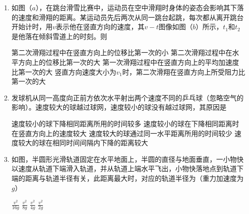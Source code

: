 
\begin{enumerate}[leftmargin=0em]
\renewcommand{\labelenumi}{\arabic{enumi}.}
\item
{}
如图（$ a $），在跳台滑雪比赛中，运动员在空中滑翔时身体的姿态会影响其下落的速度和滑翔的距离。某运动员先后两次从同一跳台起跳，每次都从离开跳台开始计时，用$ v $表示他在竖直方向的速度，其$ v-t $图像如图（$ b $）所示，$ t_{1} $和$ t_{2} $是他落在倾斜雪道上的时刻。则  
\begin{figure}[h!]
\centering

\end{figure}


\fourchoices
{第二次滑翔过程中在竖直方向上的位移比第一次的小}
{第二次滑翔过程中在水平方向上的位移比第一次的大}
{第一次滑翔过程中在竖直方向上的平均加速度比第一次的大}
{竖直方向速度大小为$ v_{1} $时，第二次滑翔在竖直方向上所受阻力比第一次的大}





\item 
{}
发球机从同一高度向正前方依次水平射出两个速度不同的乒乓球（忽略空气的影响）。速度较大的球越过球网，速度较小的球没有越过球网，其原因是  

\fourchoices
{速度较小的球下降相同距离所用的时间较多}
{速度较小的球在下降相同距离时在竖直方向上的速度较大}
{速度较大的球通过同一水平距离所用的时间较少}
{速度较大的球在相同时间间隔内下降的距离较大}



\item 
{}
如图，半圆形光滑轨道固定在水平地面上，半圆的直径与地面垂直，一小物快以速度从轨道下端滑入轨道，并从轨道上端水平飞出，小物快落地点到轨道下端的距离与轨道半径有关，此距离最大时，对应的轨道半径为（重力加速度为$ g $）  
\begin{figure}[h!]
\centering

\end{figure}

\fourchoices
{$ \frac { v ^ { 2 } } { 16 g } $}
{$ \frac { v ^ { 2 } } { 8 g } $}
{$ \frac { v ^ { 2 } } { 4 g } $}
{$ \frac { v ^ { 2 } } { 2 g } $}




\end{enumerate}
